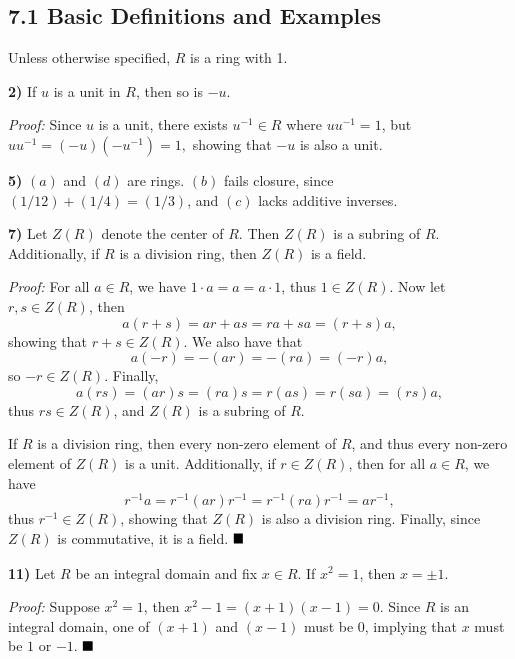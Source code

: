 \documentclass[12pt]{article}
\newcommand{\proof}{\textit{Proof: }}
\newcommand{\done}{\ensuremath{\strut\hfill\blacksquare}}
\begin{document}
\pagestyle{fancy}

\setlength{\parindent}{0in}
\setlength{\parskip}{0.15in}

\subsection*{7.1 Basic Definitions and Examples}

Unless otherwise specified, \( R \) is a ring with 1.

\textbf{2)}
If \( u \) is a unit in \( R \), then so is \( -u \).

\proof
Since \( u \) is a unit, there exists \( u^{-1} \in R \) where
\( uu^{-1} = 1 \), but \( uu^{-1} = (-u)(-u^{-1}) = 1, \) showing that \( -u \)
is also a unit.

\textbf{5)} \( (a) \) and \( (d) \) are rings. \( (b) \) fails closure, since
\( (1/12) + (1/4) = (1/3) \), and \( (c) \) lacks additive inverses.

\textbf{7)}
Let \( Z(R) \) denote the center of \( R \).
Then \( Z(R) \) is a subring of \( R \).
Additionally, if \( R \) is a division ring, then \( Z(R) \) is a field.

\proof
For all \( a \in R \), we have \( 1 \cdot a = a = a \cdot 1 \), thus
\( 1 \in Z(R) \).
Now let \( r, s \in Z(R) \), then
\[
	a(r + s) = ar + as = ra + sa = (r + s)a,
\]
showing that \( r + s \in Z(R) \).
We also have that
\[
	a(-r) = -(ar) = -(ra) = (-r)a,
\]
so \( -r \in Z(R) \).
Finally,
\[
	a(rs) = (ar)s = (ra)s = r(as) = r(sa) = (rs)a,
\]
thus \( rs \in Z(R) \), and \( Z(R) \) is a subring of \( R \).

If \( R \) is a division ring, then every non-zero element of \( R \), and thus
every non-zero element of \( Z(R) \) is a unit.
Additionally, if \( r \in Z(R) \), then for all \( a \in R \), we have
\[
	r^{-1}a = r^{-1}(ar)r^{-1} = r^{-1}(ra)r^{-1} = ar^{-1},
\]
thus \( r^{-1} \in Z(R) \), showing that \( Z(R) \) is also a division ring.
Finally, since \( Z(R) \) is commutative, it is a field.
\done

\textbf{11)}
Let \( R \) be an integral domain and fix \( x \in R \).
If \( x^2 = 1 \), then \( x = \pm 1 \).

\proof
Suppose \( x^2 = 1 \), then \( x^2 - 1 = (x + 1)(x - 1) = 0 \).
Since \( R \) is an integral domain, one of \( (x + 1) \) and \( (x - 1) \)
must be 0, implying that \( x \) must be \( 1 \) or \( -1 \).
\done
\end{document}
